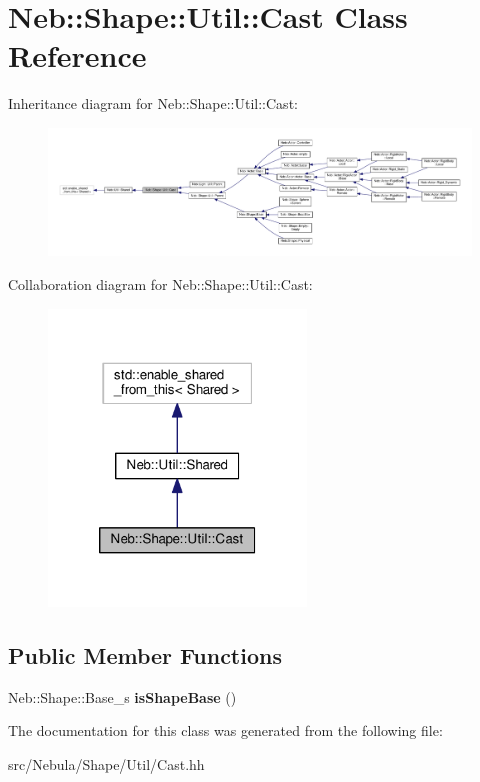 \hypertarget{classNeb_1_1Shape_1_1Util_1_1Cast}{\section{Neb\-:\-:Shape\-:\-:Util\-:\-:Cast Class Reference}
\label{classNeb_1_1Shape_1_1Util_1_1Cast}
}


Inheritance diagram for Neb\-:\-:Shape\-:\-:Util\-:\-:Cast\-:
\nopagebreak
\begin{figure}[H]
\begin{center}
\leavevmode
\includegraphics[width=350pt]{classNeb_1_1Shape_1_1Util_1_1Cast__inherit__graph}
\end{center}
\end{figure}


Collaboration diagram for Neb\-:\-:Shape\-:\-:Util\-:\-:Cast\-:
\nopagebreak
\begin{figure}[H]
\begin{center}
\leavevmode
\includegraphics[width=194pt]{classNeb_1_1Shape_1_1Util_1_1Cast__coll__graph}
\end{center}
\end{figure}
\subsection*{Public Member Functions}
\begin{DoxyCompactItemize}
\item 
\hypertarget{classNeb_1_1Shape_1_1Util_1_1Cast_ae0f12f8f3b4bf6cf15b697249208a087}{Neb\-::\-Shape\-::\-Base\-\_\-s {\bfseries is\-Shape\-Base} ()}\label{classNeb_1_1Shape_1_1Util_1_1Cast_ae0f12f8f3b4bf6cf15b697249208a087}

\end{DoxyCompactItemize}


The documentation for this class was generated from the following file\-:\begin{DoxyCompactItemize}
\item 
src/\-Nebula/\-Shape/\-Util/Cast.\-hh\end{DoxyCompactItemize}
